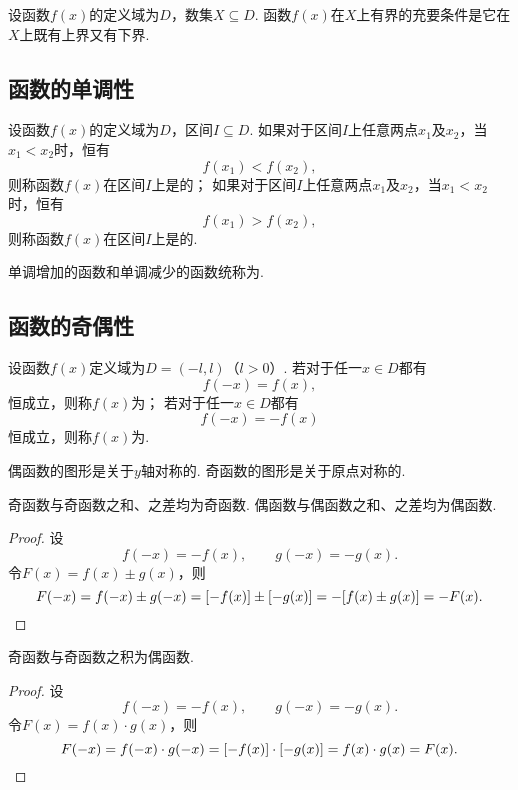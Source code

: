 \begin{theorem}
设函数\(f(x)\)的定义域为\(D\)，数集\(X \subseteq D\).
函数\(f(x)\)在\(X\)上有界的充要条件是它在\(X\)上既有上界又有下界.
\end{theorem}

\subsection{函数的单调性}
\begin{definition}
设函数\(f(x)\)的定义域为\(D\)，区间\(I \subseteq D\).
如果对于区间\(I\)上任意两点\(x_1\)及\(x_2\)，当\(x_1 < x_2\)时，恒有\[
f(x_1) < f(x_2),
\]则称函数\(f(x)\)在区间\(I\)上是的；
如果对于区间\(I\)上任意两点\(x_1\)及\(x_2\)，当\(x_1 < x_2\)时，恒有\[
f(x_1) > f(x_2),
\]则称函数\(f(x)\)在区间\(I\)上是的.

单调增加的函数和单调减少的函数统称为.
\end{definition}

\subsection{函数的奇偶性}
\begin{definition}
设函数\(f(x)\)定义域为\(D=(-l,l)\)（\(l>0\)）.
若对于任一\(x \in D\)都有\[
f(-x) = f(x),
\]恒成立，则称\(f(x)\)为；
若对于任一\(x \in D\)都有\[
f(-x) = -f(x)
\]恒成立，则称\(f(x)\)为.
\end{definition}

\begin{property}
偶函数的图形是关于\(y\)轴对称的.
奇函数的图形是关于原点对称的.
\end{property}

\begin{property}
奇函数与奇函数之和、之差均为奇函数.
偶函数与偶函数之和、之差均为偶函数.
\begin{proof}
设\[
f(-x) = -f(x), \qquad g(-x) = -g(x).
\]令\(F(x) = f(x) \pm g(x)\)，则\[
F(-x) = f(-x) \pm g(-x)
= [-f(x)] \pm [-g(x)]
= -[f(x) \pm g(x)]
= -F(x).
\qedhere
\]
\end{proof}
\end{property}

\begin{property}
奇函数与奇函数之积为偶函数.
\begin{proof}
设\[
f(-x) = -f(x), \qquad g(-x) = -g(x).
\]令\(F(x) = f(x) \cdot g(x)\)，则\[
F(-x) = f(-x) \cdot g(-x)
= [-f(x)] \cdot [-g(x)]
= f(x) \cdot g(x)
= F(x).
\qedhere
\]
\end{proof}
\end{property}

